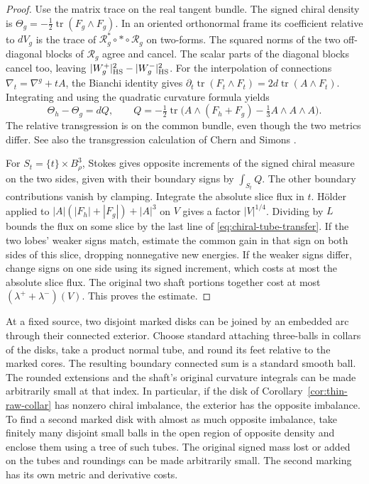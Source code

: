 \begin{proof}
Use the matrix trace on the real tangent bundle. The signed chiral
density is
\(\Theta_g=-\tfrac12\operatorname{tr}(F_g\wedge F_g)\).
In an oriented orthonormal frame its coefficient relative to
\(dV_g\) is the trace of \(\mathcal R_g^{*}\circ *\circ\mathcal R_g\) on
two-forms. The squared norms of the two off-diagonal blocks of
\(\mathcal R_g\) agree and cancel. The scalar parts of the
diagonal blocks cancel too, leaving
\(|W_g^+|_{\rm HS}^2-|W_g^-|_{\rm HS}^2\).
For the interpolation of connections \(\nabla_t=\nabla^g+tA\),
the Bianchi identity gives
\(\partial_t\operatorname{tr}(F_t\wedge F_t)
 =2d\operatorname{tr}(A\wedge F_t)\).
Integrating and using the quadratic curvature formula yields
\[
 \Theta_h-\Theta_g=dQ,\qquad
 Q=-\tfrac12\operatorname{tr}\bigl(
     A\wedge(F_h+F_g)-\tfrac13 A\wedge A\wedge A\bigr).
\]
The relative transgression is on the common bundle, even though
the two metrics differ. See also the transgression calculation of
Chern and Simons \cite[Proposition~3.2]{ChernSimons1974Characteristic}.

For \(S_t=\{t\}\times B_\rho^3\), Stokes gives opposite increments
of the signed chiral measure on the two sides, given with their
boundary signs by \(\int_{S_t}Q\). The other boundary contributions
vanish by clamping. Integrate the absolute slice flux in \(t\).
H\"older applied to
\(|A|(|F_h|+|F_g|)+|A|^3\) on \(V\)
gives a factor \(|V|^{1/4}\). Dividing by \(L\) bounds the flux on
some slice by the last line of \eqref{eq:chiral-tube-transfer}.
If the two lobes' weaker signs match, estimate the common gain in
that sign on both sides of this slice, dropping nonnegative new
energies. If the weaker signs differ, change signs on one side
using its signed increment, which costs at most the absolute
slice flux. The original two shaft portions together cost at most
\((\lambda^++\lambda^-)(V)\). This proves the estimate.
\end{proof}

At a fixed source, two disjoint marked disks can be joined by
an embedded arc through their connected exterior. Choose standard
attaching three-balls in collars of the disks, take a product
normal tube, and round its feet relative to the marked cores.
The resulting boundary connected sum is a standard smooth ball.
The rounded extensions and the shaft's original curvature
integrals can be made arbitrarily small at that index. In
particular, if the disk of Corollary~\ref{cor:thin-raw-collar}
has nonzero chiral imbalance, the exterior has the opposite
imbalance. To find a second marked disk with almost as much
opposite imbalance, take finitely many disjoint small balls in
the open region of opposite density and enclose them using a
tree of such tubes. The original signed mass lost or added on
the tubes and roundings can be made arbitrarily small. The
second marking has its own metric and derivative costs.

